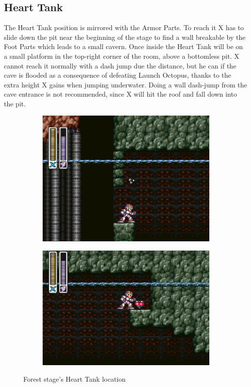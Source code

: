 \subsection{Heart Tank}
The Heart Tank position is mirrored with the Armor Parts. To reach it X has to slide down the pit near the beginning of the stage to find a wall breakable by the Foot Parts which leads to a small cavern. Once inside the Heart Tank will be on a small platform in the top-right corner of the room, above a bottomless pit. X cannot reach it normally with a dash jump due the distance, but he can if  the cave is flooded as a consequence of defeating Launch Octopus, thanks to the extra height X gains when jumping underwater. Doing a wall dash-jump from the cave entrance is not recommended, since X will hit the roof and fall down into the pit.
\begin{figure}[htp]
	\centering
	\begin{subfigure}{0.4\linewidth}
		\centering
		\includegraphics[width=\linewidth]{figures/X1/Sting_chameleon/Sting_heart_1.jpg}
	\end{subfigure}
	\begin{subfigure}{0.45\linewidth}
		\centering
		\includegraphics[width=\linewidth]{figures/X1/Sting_chameleon/Sting_heart_2.jpg}
	\end{subfigure}
	\caption{Forest stage's Heart Tank location}
\end{figure}

